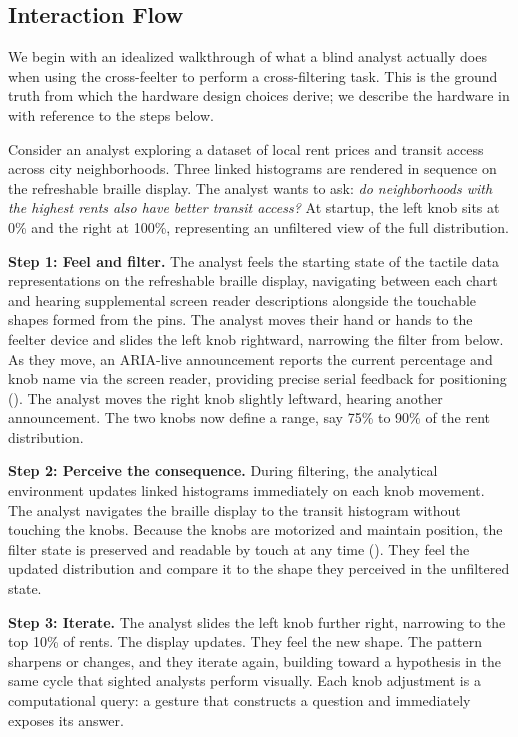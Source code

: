 \documentclass[12pt]{cmuthesis}
\begin{document}
\subsection{Interaction Flow} 

We begin with an idealized walkthrough of what a blind analyst actually does when using the cross-feelter to perform a cross-filtering task. This is the ground truth from which the hardware design choices derive; we describe the hardware in  with reference to the steps below.

Consider an analyst exploring a dataset of local rent prices and transit access across city neighborhoods. Three linked histograms are rendered in sequence on the refreshable braille display. The analyst wants to ask: \textit{do neighborhoods with the highest rents also have better transit access?} At startup, the left knob sits at 0\% and the right at 100\%, representing an unfiltered view of the full distribution.

\textbf{Step 1: Feel and filter.} The analyst feels the starting state of the tactile data representations on the refreshable braille display, navigating between each chart and hearing supplemental screen reader descriptions alongside the touchable shapes formed from the pins. The analyst moves their hand or hands to the feelter device and slides the left knob rightward, narrowing the filter from below. As they move, an ARIA-live announcement reports the current percentage and knob name via the screen reader, providing precise serial feedback for positioning (). The analyst moves the right knob slightly leftward, hearing another announcement. The two knobs now define a range, say 75\% to 90\% of the rent distribution.

\textbf{Step 2: Perceive the consequence.} During filtering, the analytical environment updates linked histograms immediately on each knob movement. The analyst navigates the braille display to the transit histogram without touching the knobs. Because the knobs are motorized and maintain position, the filter state is preserved and readable by touch at any time (). They feel the updated distribution and compare it to the shape they perceived in the unfiltered state.

\textbf{Step 3: Iterate.} The analyst slides the left knob further right, narrowing to the top 10\% of rents. The display updates. They feel the new shape. The pattern sharpens or changes, and they iterate again, building toward a hypothesis in the same cycle that sighted analysts perform visually. Each knob adjustment is a computational query: a gesture that constructs a question and immediately exposes its answer.
\end{document}
